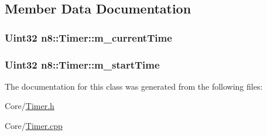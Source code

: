 \subsection{Member Data Documentation}
\hypertarget{classn8_1_1_timer_af8d189a52bfd4dd1d00322602627327d}{
\subsubsection[{m\-\_\-current\-Time}]{\setlength{\rightskip}{0pt plus 5cm}Uint32 n8\-::\-Timer\-::m\-\_\-current\-Time\hspace{0.3cm}{\ttfamily [private]}}}\label{classn8_1_1_timer_af8d189a52bfd4dd1d00322602627327d}
\hypertarget{classn8_1_1_timer_a4ea04e459f66f523e443dad9cfb78241}{
\subsubsection[{m\-\_\-start\-Time}]{\setlength{\rightskip}{0pt plus 5cm}Uint32 n8\-::\-Timer\-::m\-\_\-start\-Time\hspace{0.3cm}{\ttfamily [private]}}}\label{classn8_1_1_timer_a4ea04e459f66f523e443dad9cfb78241}


The documentation for this class was generated from the following files\-:\begin{DoxyCompactItemize}
\item 
Core/\hyperlink{_timer_8h}{Timer.\-h}\item 
Core/\hyperlink{_timer_8cpp}{Timer.\-cpp}\end{DoxyCompactItemize}
